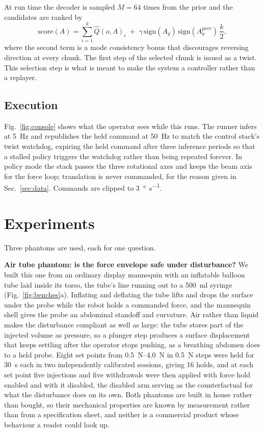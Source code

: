 \documentclass[conference]{IEEEtran}
\begin{document}
At run time the decoder is sampled $M = 64$ times from the prior and the
candidates are ranked by
\begin{equation}
\mathrm{score}(A) = \sum_{i=1}^{k} \hat Q(o, A)_i
\;+\; \gamma \, \mathrm{sign}(A_y)\, \mathrm{sign}(A_y^{\mathrm{prev}})\, \frac{k}{2},
\label{eq:select}
\end{equation}
where the second term is a mode consistency bonus that discourages reversing
direction at every chunk. The first step of the selected chunk is issued as a
twist. This selection step is what is meant to make the system a controller
rather than a replayer.

\subsection{Execution}

Fig.~\ref{fig:console} shows what the operator sees while this runs. The runner
infers at \SI{5}{\hertz} and republishes the held command at
\SI{50}{\hertz} to match the control stack's twist watchdog, expiring the held
command after three inference periods so that a stalled policy triggers the
watchdog rather than being repeated forever. In policy mode the stack passes the
three rotational axes and keeps the beam axis for the force loop; translation is
never commanded, for the reason given in Sec.~\ref{sec:data}. Commands are
clipped to \SI{3}{\degree\per\second}.

\section{Experiments}
\label{sec:exp}

Three phantoms are used, each for one question.

\textbf{Air tube phantom: is the force envelope safe under disturbance?} We
built this one from an ordinary display mannequin with an inflatable balloon
tube laid inside its torso, the tube's line running out to a
\SI{500}{\milli\litre} syringe (Fig.~\ref{fig:benches}a). Inflating and deflating the tube lifts and drops the
surface under the probe while the robot holds a commanded force, and the
mannequin shell gives the probe an abdominal standoff and curvature. Air rather
than liquid makes the disturbance compliant as well as large: the tube stores
part of the injected volume as pressure, so a plunger step produces a surface
displacement that keeps settling after the operator stops pushing, as a
breathing abdomen does to a held probe. Eight set points from \SIrange{0.5}{4.0}{\newton} in \SI{0.5}{\newton} steps were held
for \SI{30}{\second} each in two independently calibrated sessions, giving 16
holds, and at each set point five injections and five withdrawals were then
applied with force hold enabled and with it disabled, the disabled arm serving
as the counterfactual for what the disturbance does on its own.
Both phantoms are built in house rather than bought, so their mechanical
properties are known by measurement rather than from a specification sheet, and
neither is a commercial product whose behaviour a reader could look up.
\end{document}
